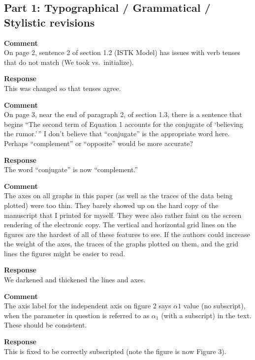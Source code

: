 \subsection{Part 1: Typographical / Grammatical / Stylistic revisions}
\setcounter{rev1-part1}{1}

\textbf{Comment } \\
On page 2, sentence 2 of section 1.2 (ISTK Model) has issues with verb tenses that do not match (We took vs.\ initialize).

\textbf{Response } \\
This was changed so that tenses agree.

\textbf{Comment } \\
On page 3, near the end of paragraph 2, of section 1.3, there is a sentence that begins ``The second term of Equation 1 accounts for the conjugate of `believing the rumor.'\,'' I don't believe that ``conjugate'' is the appropriate word here. Perhaps ``complement'' or ``opposite'' would be more accurate?

\textbf{Response } \\
The word ``conjugate'' is now ``complement.''

\textbf{Comment } \\
The axes on all graphs in this paper (as well as the traces of the data being plotted) were too thin.
They barely showed up on the hard copy of the manuscript that I printed for myself.
They were also rather faint on the screen rendering of the electronic copy.
The vertical and horizontal grid lines on the figures are the hardest of all of these features to see.
If the authors could increase the weight of the axes, the traces of the graphs plotted on them, and the grid lines the figures might be easier to read.

\textbf{Response } \\
We darkened and thickened the lines and axes.

\textbf{Comment } \\
The axis label for the independent axis on figure 2 says $ \alpha 1 $ value (no subscript), when the parameter in question is referred to as $ \alpha_1 $ (with a subscript) in the text.
These should be consistent.

\textbf{Response } \\
This is fixed to be correctly subscripted (note the figure is now Figure 3).
